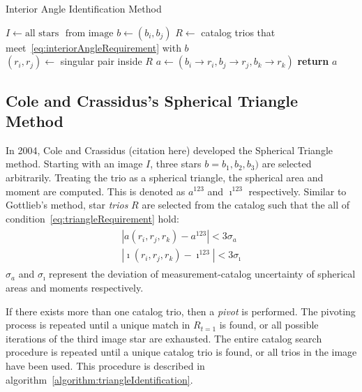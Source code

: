 \begin{algorithm}
    \caption{Interior Angle Identification Method} \label{algorithm:interiorAngleIdentification}
    \begin{algorithmic}[1]
        \State $I \gets \text{all stars } \text{ from image}$
        \State $b \gets (b_i, b_j)$
        \State $R \gets $ catalog trios that meet~\eqref{eq:interiorAngleRequirement} with $b$
        \\
        \State $(r_i, r_j) \gets $ singular pair inside $R$
        \State $a \gets (b_i \rightarrow r_i, b_j \rightarrow r_j, b_k \rightarrow r_k)$
        \State \textbf{return} $a$
        \EndIf
        \EndFor
        \EndFor
        \EndFor
        \EndProcedure
    \end{algorithmic}
\end{algorithm}

\subsection{Cole and Crassidus's Spherical Triangle Method}\label{subsec:coleAndCrassidus'sSphericalTriangleMethod}
In 2004, Cole and Crassidus (citation here) developed the Spherical Triangle method. Starting with an image $I$, three
stars $b = b_1, b_2, b_3)$ are selected arbitrarily. Treating the trio as a spherical triangle, the spherical area and
moment are computed. This is denoted as $a^{123}$ and $\imath^{123}$ respectively. Similar to Gottlieb's method, star
\textit{trios} $R$ are selected from the catalog such that the all of condition~\eqref{eq:triangleRequirement} hold:
\begin{align}
    \begin{split}
        \label{eq:triangleRequirement}
        | a(r_i, r_j, r_k) - a^{123} | < 3 \sigma_a
        \\
        | \imath(r_i, r_j, r_k) - \imath^{123} | < 3\sigma_{\imath}
    \end{split}
\end{align}
$\sigma_a$ and $\sigma_{\imath}$ represent the deviation of measurement-catalog uncertainty of spherical areas and
moments respectively.

If there exists more than one catalog trio, then a \textit{pivot} is performed. The pivoting process is repeated until
a unique match in $R_{t=1}$ is found, or all possible iterations of the third image star are exhausted. The entire
catalog search procedure is repeated until a unique catalog trio is found, or all trios in the image have been used.
This procedure is described in algorithm~\autoref{algorithm:triangleIdentification}.


